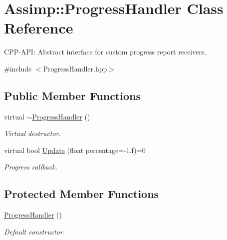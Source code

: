 \hypertarget{classAssimp_1_1ProgressHandler}{\section{\-Assimp\-:\-:\-Progress\-Handler \-Class \-Reference}
\label{classAssimp_1_1ProgressHandler}
}


\-C\-P\-P-\/\-A\-P\-I\-: \-Abstract interface for custom progress report receivers.  




{\ttfamily \#include $<$\-Progress\-Handler.\-hpp$>$}

\subsection*{\-Public \-Member \-Functions}
\begin{DoxyCompactItemize}
\item 
\hypertarget{classAssimp_1_1ProgressHandler_a3ec465a62e1feaae00f585ca0cffb81e}{virtual \hyperlink{classAssimp_1_1ProgressHandler_a3ec465a62e1feaae00f585ca0cffb81e}{$\sim$\-Progress\-Handler} ()}\label{classAssimp_1_1ProgressHandler_a3ec465a62e1feaae00f585ca0cffb81e}

\begin{DoxyCompactList}\small\item\em \-Virtual destructor. \end{DoxyCompactList}\item 
virtual bool \hyperlink{classAssimp_1_1ProgressHandler_ab08a1d300d434f6dd86ca41747cba448}{\-Update} (float percentage=-\/1.f)=0
\begin{DoxyCompactList}\small\item\em \-Progress callback. \end{DoxyCompactList}\end{DoxyCompactItemize}
\subsection*{\-Protected \-Member \-Functions}
\begin{DoxyCompactItemize}
\item 
\hypertarget{classAssimp_1_1ProgressHandler_a53b192913e9904c674b851c46e1ea9e8}{\hyperlink{classAssimp_1_1ProgressHandler_a53b192913e9904c674b851c46e1ea9e8}{\-Progress\-Handler} ()}\label{classAssimp_1_1ProgressHandler_a53b192913e9904c674b851c46e1ea9e8}

\begin{DoxyCompactList}\small\item\em \-Default constructor. \end{DoxyCompactList}\end{DoxyCompactItemize}


